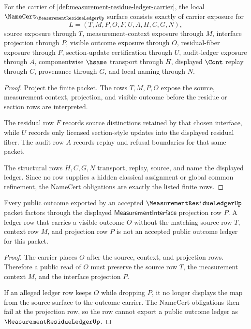 \begin{theorem}
\label{thm:measurement-residue-ledger-namecert-obligations}
For the carrier of \autoref{def:measurement-residue-ledger-carrier}, the local $\NameCert_{\MeasurementResidueLedgerUp}$ surface consists exactly of carrier exposure for
$$
L=(T,M,P,O,F,U,A,H,C,G,N),
$$
source exposure through $T$, measurement-context exposure through $M$, interface projection through $P$, visible outcome exposure through $O$, residual-fiber exposure through $F$, section-update certification through $U$, audit-ledger exposure through $A$, componentwise $\hsame$ transport through $H$, displayed $\Cont$ replay through $C$, provenance through $G$, and local naming through $N$.
\end{theorem}
\begin{proof}
Project the finite packet. The rows $T,M,P,O$ expose the source, measurement context, projection, and visible outcome before the residue or section rows are interpreted.

The residual row $F$ records source distinctions retained by that chosen interface, while $U$ records only licensed section-style updates into the displayed residual fiber. The audit row $A$ records replay and refusal boundaries for that same packet.

The structural rows $H,C,G,N$ transport, replay, source, and name the displayed ledger. Since no row supplies a hidden classical assignment or global common refinement, the NameCert obligations are exactly the listed finite rows.
\end{proof}

\begin{theorem}
\label{thm:measurement-residue-ledger-interface-projection}
Every public outcome exported by an accepted $\MeasurementResidueLedgerUp$ packet factors through the displayed $\mathsf{MeasurementInterface}$ projection row $P$. A ledger row that carries a visible outcome $O$ without the matching source row $T$, context row $M$, and projection row $P$ is not an accepted public outcome ledger for this packet.
\end{theorem}
\begin{proof}
The carrier places $O$ after the source, context, and projection rows. Therefore a public read of $O$ must preserve the source row $T$, the measurement context $M$, and the interface projection $P$.

If an alleged ledger row keeps $O$ while dropping $P$, it no longer displays the map from the source surface to the outcome carrier. The NameCert obligations then fail at the projection row, so the row cannot export a public outcome ledger as $\MeasurementResidueLedgerUp$.
\end{proof}

